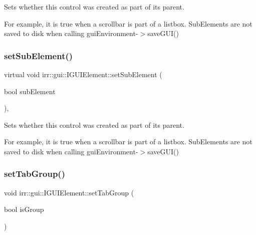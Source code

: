 Sets whether this control was created as part of its parent. 

For example, it is true when a scrollbar is part of a listbox. Sub\+Elements are not saved to disk when calling gui\+Environment-\/$>$save\+G\+U\+I() \mbox{\label{classirr_1_1gui_1_1IGUIElement_a50eb859808b65ee24fbdd69e69118a8d}} 
\subsubsection{\texorpdfstring{set\+Sub\+Element()}{setSubElement()}\hspace{0.1cm}{\footnotesize\ttfamily [2/2]}}
{\footnotesize\ttfamily virtual void irr\+::gui\+::\+I\+G\+U\+I\+Element\+::set\+Sub\+Element (\begin{DoxyParamCaption}\item[{bool}]{sub\+Element }\end{DoxyParamCaption})\hspace{0.3cm}{\ttfamily [inline]}, {\ttfamily [virtual]}}



Sets whether this control was created as part of its parent. 

For example, it is true when a scrollbar is part of a listbox. Sub\+Elements are not saved to disk when calling gui\+Environment-\/$>$save\+G\+U\+I() \mbox{\label{classirr_1_1gui_1_1IGUIElement_aa44a46f3b639ca1b095f855c9d9c959d}} 
\subsubsection{\texorpdfstring{set\+Tab\+Group()}{setTabGroup()}\hspace{0.1cm}{\footnotesize\ttfamily [1/2]}}
{\footnotesize\ttfamily void irr\+::gui\+::\+I\+G\+U\+I\+Element\+::set\+Tab\+Group (\begin{DoxyParamCaption}\item[{bool}]{is\+Group }\end{DoxyParamCaption})\hspace{0.3cm}{\ttfamily [inline]}}




